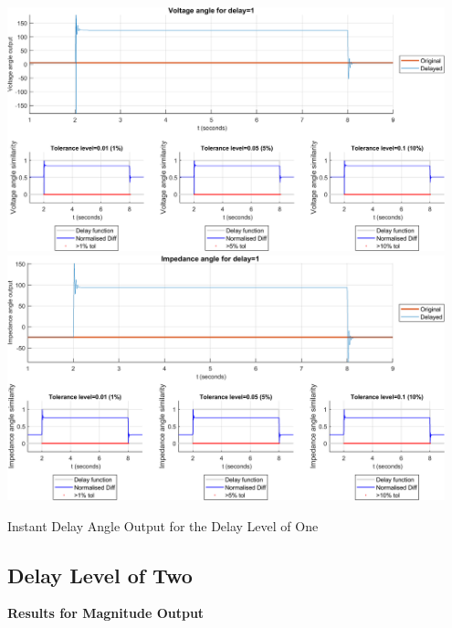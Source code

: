 \begin{floatingfigure}[p]{\textwidth}
    \includegraphics[width=0.95\textwidth]{PMUsim-figures/DelayOf_1/Instant_vAngle.png}    
    \includegraphics[width=0.95\textwidth]{PMUsim-figures/DelayOf_1/Instant_iAngle.png}    
      \label{fig:PMUsim_One_Angle}
    \caption{Instant Delay Angle Output for the Delay Level of One}
\end{floatingfigure}

\newpage \subsection{Delay Level of Two}
\textbf{Results for Magnitude Output}

